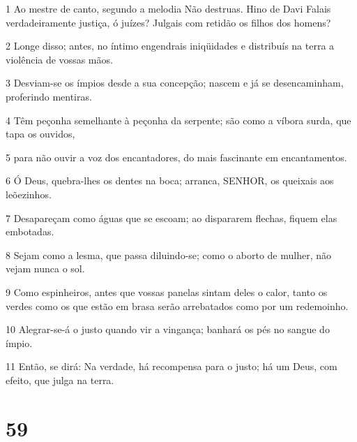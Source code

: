 \par 1 Ao mestre de canto, segundo a melodia Não destruas. Hino de Davi Falais verdadeiramente justiça, ó juízes? Julgais com retidão os filhos dos homens?
\par 2 Longe disso; antes, no íntimo engendrais iniqüidades e distribuís na terra a violência de vossas mãos.
\par 3 Desviam-se os ímpios desde a sua concepção; nascem e já se desencaminham, proferindo mentiras.
\par 4 Têm peçonha semelhante à peçonha da serpente; são como a víbora surda, que tapa os ouvidos,
\par 5 para não ouvir a voz dos encantadores, do mais fascinante em encantamentos.
\par 6 Ó Deus, quebra-lhes os dentes na boca; arranca, SENHOR, os queixais aos leõezinhos.
\par 7 Desapareçam como águas que se escoam; ao dispararem flechas, fiquem elas embotadas.
\par 8 Sejam como a lesma, que passa diluindo-se; como o aborto de mulher, não vejam nunca o sol.
\par 9 Como espinheiros, antes que vossas panelas sintam deles o calor, tanto os verdes como os que estão em brasa serão arrebatados como por um redemoinho.
\par 10 Alegrar-se-á o justo quando vir a vingança; banhará os pés no sangue do ímpio.
\par 11 Então, se dirá: Na verdade, há recompensa para o justo; há um Deus, com efeito, que julga na terra.

\chapter{59}

